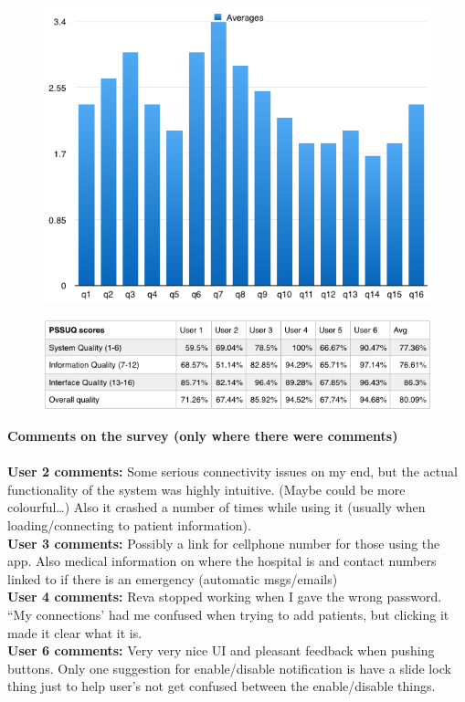 \documentclass[12pt]{article}
\begin{document}
{\begin{center}
\begin{figure}[h]
		\includegraphics[width=\textwidth]{tests/usab/avgs.png}
	\end{figure}
	\begin{figure}[h]
		\includegraphics[width=\textwidth]{tests/usab/pssuq.png}
	\end{figure}
\end{center}

\textbf{Comments on the survey (only where there were comments)}\\
\\
\textbf{User 2 comments:}  Some serious connectivity issues on my end, but the actual functionality of the system was highly intuitive. (Maybe could be more colourful…) Also it crashed a number of times while using it (usually when loading/connecting to patient information). \\
\textbf{User 3 comments:}  Possibly a link for cellphone number for those using the app. Also medical information on where the hospital is and contact numbers linked to if there is an emergency (automatic msgs/emails) \\
\textbf{User 4 comments:} Reva stopped working when I gave the wrong password. “My connections’ had me confused when trying to add patients, but clicking it made it clear what it is. \\
\textbf{User 6 comments:} Very very nice UI and pleasant feedback when pushing buttons. Only one suggestion for enable/disable notification is have a slide lock thing just to help user’s not get confused between the enable/disable things.  \\ \\

}
\end{document}
